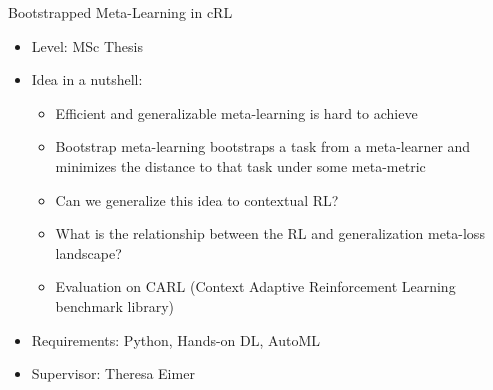 \documentclass[aspectratio=169]{../latex_main/tntbeamer}  %
\begin{document}
\begin{frame}[c]{Bootstrapped Meta-Learning in cRL}
	
    \begin{itemize}
		\item Level: MSc Thesis
		\item Idea in a nutshell:
		\begin{itemize}
		    \item Efficient and generalizable meta-learning is hard to achieve
		    \item Bootstrap meta-learning bootstraps a task from a meta-learner and minimizes the distance to that task under some meta-metric
		    \item Can we generalize this idea to contextual RL?
		    \item What is the relationship between the RL and generalization meta-loss landscape?
		    \item Evaluation on CARL (Context Adaptive Reinforcement Learning benchmark library)
		\end{itemize}
		\item Requirements: Python, Hands-on DL, AutoML
		\item Supervisor: Theresa Eimer
	\end{itemize}
	
\end{frame}
	
	
\end{document}

